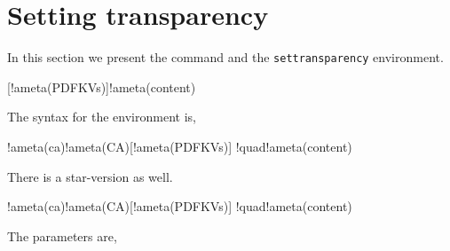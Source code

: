 \documentclass{article}
\let\env\texttt
\begin{document}
\section{Setting transparency}

In this section we present the  command and the
\env{settransparency} environment.

\bVerb{}%
\begin{dCmd}[commandchars=!()]{\bxSize}
[!ameta(PDFKVs)]{!ameta(content)}
\end{dCmd}
\eVerb The syntax for the environment is,
\bVerb{}%
\begin{dCmd}[commandchars=!()]{\bxSize}
\begin{settransparency}[!ameta(BM)]{!ameta(ca)}{!ameta(CA)}[!ameta(PDFKVs)]
!quad!ameta(content)
\end{settransparency}
\end{dCmd}
\eVerb There is a star-version as well.
\bVerb{}%
\begin{dCmd}[commandchars=!()]{\bxSize}
\begin{settransparency*}[!ameta(BM)]{!ameta(ca)}{!ameta(CA)}[!ameta(PDFKVs)]
!quad!ameta(content)
\end{settransparency*}
\end{dCmd}
\eVerb The parameters are,
\end{document}
